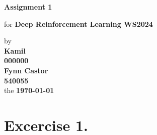 \documentclass[12pt, a4paper,DIV=12, bibliography=totocnumbered]{scrartcl}
\newcommand{\ASSNR}{1}
\newcommand{\AuthorONE}{Kamil}
\newcommand{\MatNoONE}{000000}
\newcommand{\AuthorTWO}{Fynn Castor}
\newcommand{\MatNoTWO}{540055}
\begin{document}
\begin{titlepage}
   \begin{center}
       \vspace*{5cm}

       \textbf{\Huge{Assignment \ASSNR}}

       \vspace{0.5cm}
        for {\large\textbf{Deep Reinforcement Learning WS2024}}
        \vspace{0.75cm}

       by \\
        \textbf{\AuthorONE}\\
        \vspace{0.125cm}
       	\textbf{\MatNoONE}\\ 
       	\vspace{0.25cm}
        \textbf{\AuthorTWO}\\
        \vspace{0.125cm}
       	\textbf{\MatNoTWO}\\ 
       	\vspace{0.25cm}
       the \textbf{\today}

       \vfill
    
    
            
   \end{center}
\end{titlepage}

\section{Excercise 1.}
\end{document}
